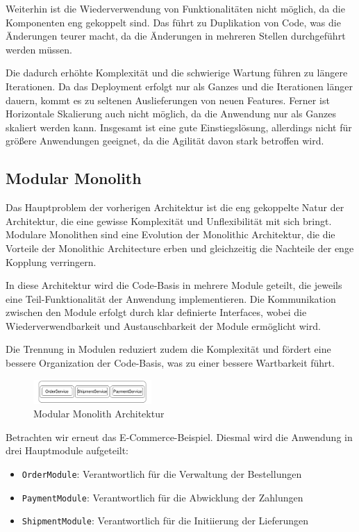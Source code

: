 \documentclass[acmtog]{acmart}
\begin{document}
Weiterhin ist die Wiederverwendung von Funktionalitäten nicht möglich, da die
Komponenten eng gekoppelt sind.
Das führt zu Duplikation von Code, was
die Änderungen teurer macht, da die Änderungen in mehreren Stellen durchgeführt werden müssen.

Die dadurch erhöhte Komplexität und die schwierige Wartung führen zu längere Iterationen.
Da das Deployment erfolgt nur als Ganzes und die Iterationen länger dauern,
kommt es zu seltenen Auslieferungen von neuen Features.
Ferner ist Horizontale Skalierung auch nicht möglich, da die Anwendung nur als Ganzes
skaliert werden kann.
Insgesamt ist eine gute Einstiegslösung, allerdings nicht für größere Anwendungen geeignet, da
 die Agilität davon stark betroffen wird.

\subsection{Modular Monolith}
Das Hauptproblem der vorherigen Architektur ist die eng gekoppelte Natur der Architektur,
die eine gewisse Komplexität und Unflexibilität mit sich bringt.
Modulare Monolithen sind eine Evolution der Monolithic  Architektur, die die Vorteile
der Monolithic Architecture erben und gleichzeitig die Nachteile der enge Kopplung verringern.

In diese Architektur wird die Code-Basis in mehrere Module geteilt, die jeweils
eine Teil-Funktionalität der Anwendung implementieren.
Die Kommunikation zwischen den Module erfolgt durch klar definierte Interfaces,
wobei die Wiederverwendbarkeit und Austauschbarkeit der Module ermöglicht wird.\cite[11]{modular-mono2}

Die Trennung in Modulen reduziert zudem die Komplexität und fördert eine bessere
 Organization der Code-Basis, was zu einer bessere Wartbarkeit führt.\cite[2]{modular-mono4}

\begin{figure}[h!]
    \centering
    \includegraphics[width=0.4\textwidth]{images/mono/mono-example.pdf}
    \caption{Modular Monolith Architektur}
    \label{fig:modular-mono}
\end{figure}

Betrachten wir erneut das E-Commerce-Beispiel.
Diesmal wird die Anwendung in drei Hauptmodule aufgeteilt:
\begin{itemize}
    \item \texttt{OrderModule}: Verantwortlich für die Verwaltung der Bestellungen
    \item \texttt{PaymentModule}: Verantwortlich für die Abwicklung der Zahlungen
    \item \texttt{ShipmentModule}: Verantwortlich für die Initiierung der Lieferungen
\end{itemize}
\end{document}
